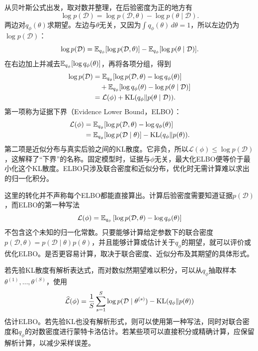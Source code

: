 从贝叶斯公式出发，取对数并整理，在后验密度为正的地方有
\begin{equation}
 \log p(\mathcal D)=\log p(\mathcal D,\theta)-\log p(\theta\mid\mathcal D).
\end{equation}
两边对$q_\phi(\theta)$求期望。左边与$\theta$无关，又因为$\int q_\phi(\theta)\,d\theta=1$，所以左边仍为$\log p(\mathcal D)$：
\begin{equation}
 \log p(\mathcal D)=\mathbb{E}_{q_\phi}[\log p(\mathcal D,\theta)]
 -\mathbb{E}_{q_\phi}[\log p(\theta\mid\mathcal D)].
\end{equation}
在右边加上并减去$\mathbb{E}_{q_\phi}[\log q_\phi(\theta)]$，再将各项分组，得到
\begin{align}
 \log p(\mathcal D)
 &=\mathbb{E}_{q_\phi}[\log p(\mathcal D,\theta)-\log q_\phi(\theta)]\notag\\
 &\quad+\mathbb{E}_{q_\phi}[\log q_\phi(\theta)-\log p(\theta\mid\mathcal D)]\notag\\
 &=\mathcal L(\phi)+\operatorname{KL}(q_\phi\|p(\theta\mid\mathcal D)).
 \label{eq:solving-vi-kl}
\end{align}
第一项称为证据下界（Evidence Lower Bound，ELBO）：
\begin{align}
 \mathcal L(\phi)
 &=\mathbb{E}_{q_\phi}[\log p(\mathcal D,\theta)-\log q_\phi(\theta)]\notag\\
 &=\mathbb{E}_{q_\phi}[\log p(\mathcal D\mid\theta)]-\operatorname{KL}(q_\phi\|p(\theta)).
 \label{eq:solving-elbo}
\end{align}
第二项是近似分布与真实后验之间的KL散度。它非负，所以$\mathcal L(\phi)\leq\log p(\mathcal D)$，这解释了“下界”的名称。固定模型时，证据与$\phi$无关，最大化ELBO便等价于最小化这个KL散度。ELBO只涉及联合密度和近似分布，优化时无需计算难以求出的归一化积分。

这里的转化并不声称每个ELBO都能直接算出。计算后验密度需要知道证据$p(\mathcal D)$，而ELBO的第一种写法
\begin{equation}
 \mathcal L(\phi)=\mathbb{E}_{q_\phi}
 \left[\log p(\mathcal D,\theta)-\log q_\phi(\theta)\right]
 \end{equation}
不包含这个未知的归一化常数。只要能够计算给定参数下的联合密度$p(\mathcal D,\theta)=p(\mathcal D\mid\theta)p(\theta)$，并且能够计算或估计关于$q_\phi$的期望，就可以评价或优化ELBO。是否更容易计算，取决于联合密度、近似分布及其期望的具体形式。

若先验KL散度有解析表达式，而对数似然期望难以积分，可以从$q_\phi$抽取样本$\theta^{(1)},\ldots,\theta^{(S)}$，使用
\begin{equation}
 \widehat{\mathcal L}(\phi)
 =\frac1S\sum_{s=1}^S\log p(\mathcal D\mid\theta^{(s)})
 -\operatorname{KL}(q_\phi\|p(\theta))
 \end{equation}
估计ELBO。若先验KL也没有解析形式，则可以使用第一种写法，同时对联合密度和$q_\phi$的对数密度进行蒙特卡洛估计。若某些项可以直接积分或精确计算，应保留解析计算，以减少采样误差。

